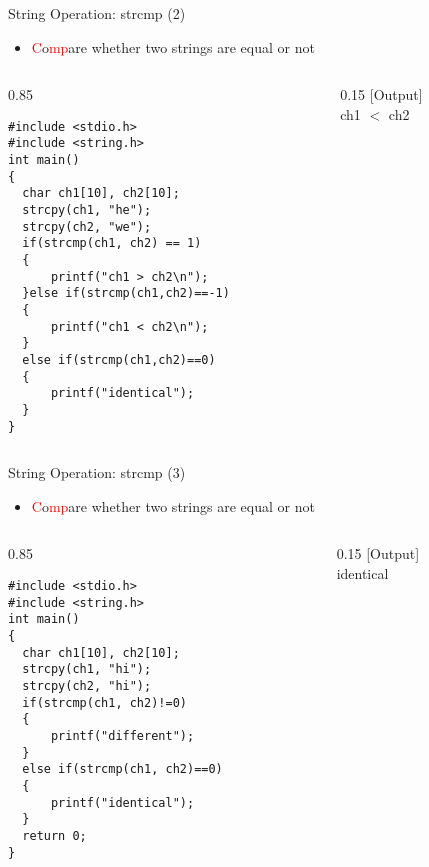 \begin{frame}[fragile]{String Operation: strcmp (2)}
\vspace{-0.10in}
\begin{itemize}
	\item {\textcolor{red}{C}o\textcolor{red}{mp}are whether two strings are equal or not}
\end{itemize}
\vspace{-0.10in}
\begin{columns}
\begin{column}{0.85\linewidth}
\begin{lstlisting}[xleftmargin=0.05\linewidth, linewidth=0.94\linewidth]
#include <stdio.h>
#include <string.h>
int main()
{
  char ch1[10], ch2[10];
  strcpy(ch1, "he");
  strcpy(ch2, "we");
  if(strcmp(ch1, ch2) == 1)
  {
      printf("ch1 > ch2\n");
  }else if(strcmp(ch1,ch2)==-1)
  {
      printf("ch1 < ch2\n");
  }
  else if(strcmp(ch1,ch2)==0)
  {
      printf("identical");
  }
}
\end{lstlisting}
\end{column}
\begin{column}{0.15\linewidth}
[Output]\\
ch1 $<$ ch2
\end{column}
\end{columns}
\end{frame}

\begin{frame}[fragile]{String Operation: strcmp (3)}
\begin{itemize}
	\item {\textcolor{red}{C}o\textcolor{red}{mp}are whether two strings are equal or not}
\end{itemize}
\vspace{-0.15in}
\begin{columns}
\begin{column}{0.85\linewidth}
\begin{lstlisting}[xleftmargin=0.05\linewidth, linewidth=0.94\linewidth]
#include <stdio.h>
#include <string.h>
int main()
{
  char ch1[10], ch2[10];
  strcpy(ch1, "hi");
  strcpy(ch2, "hi");
  if(strcmp(ch1, ch2)!=0)
  {
      printf("different");
  }
  else if(strcmp(ch1, ch2)==0)
  {
      printf("identical");
  }
  return 0;
}
\end{lstlisting}
\end{column}
\begin{column}{0.15\linewidth}
[Output]\\
identical
\end{column}
\end{columns}
\end{frame}

